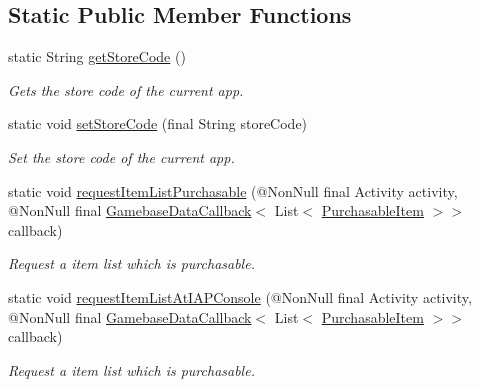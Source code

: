\subsection*{Static Public Member Functions}
\begin{DoxyCompactItemize}
\item 
static String \hyperlink{classcom_1_1toast_1_1android_1_1gamebase_1_1_gamebase_1_1_purchase_ae6a7d3ccf1e7de6fb479485cce1ddeea}{get\+Store\+Code} ()
\begin{DoxyCompactList}\small\item\em Gets the store code of the current app. \end{DoxyCompactList}\item 
static void \hyperlink{classcom_1_1toast_1_1android_1_1gamebase_1_1_gamebase_1_1_purchase_a8933fcc2fc156c87feee53efadfa4bb0}{set\+Store\+Code} (final String store\+Code)
\begin{DoxyCompactList}\small\item\em Set the store code of the current app. \end{DoxyCompactList}\item 
static void \hyperlink{classcom_1_1toast_1_1android_1_1gamebase_1_1_gamebase_1_1_purchase_a1969094885ffc1de17304f7aaf7cd4c9}{request\+Item\+List\+Purchasable} (@Non\+Null final Activity activity, @Non\+Null final \hyperlink{interfacecom_1_1toast_1_1android_1_1gamebase_1_1_gamebase_data_callback}{Gamebase\+Data\+Callback}$<$ List$<$ \hyperlink{classcom_1_1toast_1_1android_1_1gamebase_1_1base_1_1purchase_1_1_purchasable_item}{Purchasable\+Item} $>$$>$ callback)
\begin{DoxyCompactList}\small\item\em Request a item list which is purchasable. \end{DoxyCompactList}\item 
static void \hyperlink{classcom_1_1toast_1_1android_1_1gamebase_1_1_gamebase_1_1_purchase_a541b8b3f42c728a330ed1d4b6e3bc9af}{request\+Item\+List\+At\+I\+A\+P\+Console} (@Non\+Null final Activity activity, @Non\+Null final \hyperlink{interfacecom_1_1toast_1_1android_1_1gamebase_1_1_gamebase_data_callback}{Gamebase\+Data\+Callback}$<$ List$<$ \hyperlink{classcom_1_1toast_1_1android_1_1gamebase_1_1base_1_1purchase_1_1_purchasable_item}{Purchasable\+Item} $>$$>$ callback)
\begin{DoxyCompactList}\small\item\em Request a item list which is purchasable. \end{DoxyCompactList}\item 

\end{DoxyCompactItemize}
